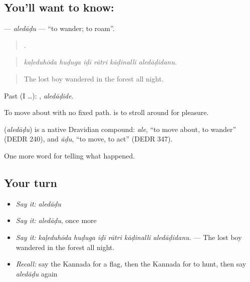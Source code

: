 \subsection*{You'll want to know: }
\textbf{} — \emph{aledāḍu} — \textquotedblleft{}to wander; to roam\textquotedblright{}.

\begin{quote}
     .
\end{quote}

\begin{quote}
\emph{kaḷeduhōda huḍuga iḍī rātri kāḍinalli aledāḍidanu.}
\end{quote}

\begin{quote}
The lost boy wandered in the forest all night.
\end{quote}

Past (I …): , \emph{aledāḍide}.

To move about with no fixed path.  is to stroll around for pleasure.

\begin{cousinweb}
\textbf{} (\emph{aledāḍu}) is a native Dravidian compound: \emph{ale}, \textquotedblleft{}to move about, to wander\textquotedblright{} (DEDR 240), and \emph{āḍu}, \textquotedblleft{}to move, to act\textquotedblright{} (DEDR 347).
\end{cousinweb}

\begin{grammarlens}[title={What you've built}]
One more word for telling what happened.
\end{grammarlens}

\subsection*{Your turn}
\begin{itemize}
\raggedright
  \item \emph{Say it:} \emph{aledāḍu}
  \item \emph{Say it:} \emph{aledāḍu}, once more
  \item \emph{Say it:} \emph{kaḷeduhōda huḍuga iḍī rātri kāḍinalli aledāḍidanu.} — The lost boy wandered in the forest all night.
  \item \emph{Recall:} say the Kannada for a flag, then the Kannada for to hunt, then say \emph{aledāḍu} again
\end{itemize}


